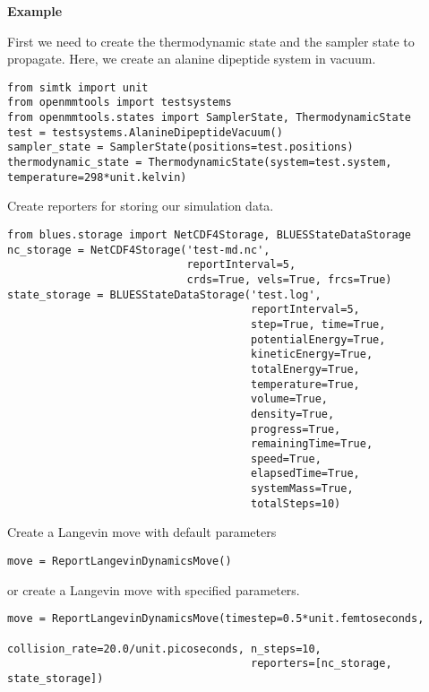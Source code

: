 \begin{description}
\item
    \textbf{Example}

First we need to create the thermodynamic state and the sampler state to
propagate. Here, we create an alanine dipeptide system in vacuum.

\begin{verbatim}
from simtk import unit
from openmmtools import testsystems
from openmmtools.states import SamplerState, ThermodynamicState
test = testsystems.AlanineDipeptideVacuum()
sampler_state = SamplerState(positions=test.positions)
thermodynamic_state = ThermodynamicState(system=test.system, temperature=298*unit.kelvin)
\end{verbatim}

Create reporters for storing our simulation data.

\begin{verbatim}
from blues.storage import NetCDF4Storage, BLUESStateDataStorage
nc_storage = NetCDF4Storage('test-md.nc',
                            reportInterval=5,
                            crds=True, vels=True, frcs=True)
state_storage = BLUESStateDataStorage('test.log',
                                      reportInterval=5,
                                      step=True, time=True,
                                      potentialEnergy=True,
                                      kineticEnergy=True,
                                      totalEnergy=True,
                                      temperature=True,
                                      volume=True,
                                      density=True,
                                      progress=True,
                                      remainingTime=True,
                                      speed=True,
                                      elapsedTime=True,
                                      systemMass=True,
                                      totalSteps=10)
\end{verbatim}

Create a Langevin move with default parameters

\begin{verbatim}
move = ReportLangevinDynamicsMove()
\end{verbatim}

or create a Langevin move with specified parameters.

\begin{verbatim}
move = ReportLangevinDynamicsMove(timestep=0.5*unit.femtoseconds,
                                      collision_rate=20.0/unit.picoseconds, n_steps=10,
                                      reporters=[nc_storage, state_storage])
\end{verbatim}


\end{description}
